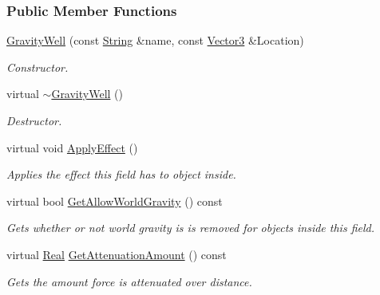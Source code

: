 \subsubsection*{Public Member Functions}
\begin{DoxyCompactItemize}
\item 
\hyperlink{classMezzanine_1_1GravityWell_a4f89751efb62bd71164a2864923dc149}{GravityWell} (const \hyperlink{namespaceMezzanine_acf9fcc130e6ebf08e3d8491aebcf1c86}{String} \&name, const \hyperlink{classMezzanine_1_1Vector3}{Vector3} \&Location)
\begin{DoxyCompactList}\small\item\em Constructor. \item\end{DoxyCompactList}\item 
virtual \hyperlink{classMezzanine_1_1GravityWell_affc992ad5e1edafd654d16d6a13840d0}{$\sim$GravityWell} ()
\begin{DoxyCompactList}\small\item\em Destructor. \item\end{DoxyCompactList}\item 
virtual void \hyperlink{classMezzanine_1_1GravityWell_a193e1683edaf80bb1a37979f196abf6e}{ApplyEffect} ()
\begin{DoxyCompactList}\small\item\em Applies the effect this field has to object inside. \item\end{DoxyCompactList}\item 
virtual bool \hyperlink{classMezzanine_1_1GravityWell_afa34a6efc22c6d8875be96cfce90c013}{GetAllowWorldGravity} () const 
\begin{DoxyCompactList}\small\item\em Gets whether or not world gravity is is removed for objects inside this field. \item\end{DoxyCompactList}\item 
virtual \hyperlink{namespaceMezzanine_a726731b1a7df72bf3583e4a97282c6f6}{Real} \hyperlink{classMezzanine_1_1GravityWell_aa077b3ef75a442b97f34bb578a7354eb}{GetAttenuationAmount} () const 
\begin{DoxyCompactList}\small\item\em Gets the amount force is attenuated over distance. \item\end{DoxyCompactList}\item 

\end{DoxyCompactItemize}

